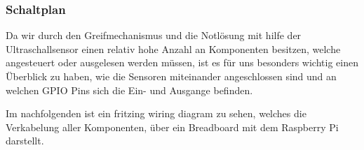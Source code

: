 
\subsubsection{Schaltplan}
Da wir durch den Greifmechanismus und die Notlösung mit hilfe der Ultraschallsensor einen relativ hohe Anzahl an Komponenten besitzen, welche angesteuert oder ausgelesen werden müssen, ist es für uns besonders wichtig einen Überblick zu haben, wie die Sensoren miteinander angeschlossen sind und an welchen GPIO Pins sich die Ein- und Ausgange befinden.

Im nachfolgenden ist ein fritzing wiring diagram zu sehen, welches die Verkabelung aller Komponenten, über ein Breadboard mit dem Raspberry Pi darstellt.




